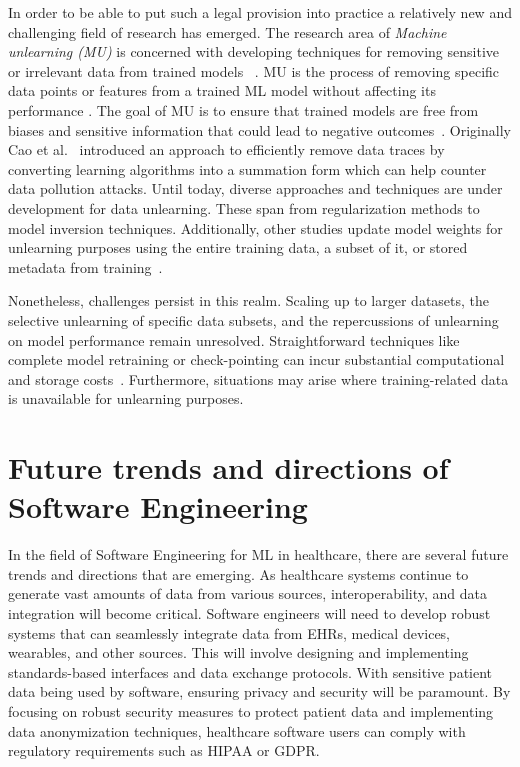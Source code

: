 \documentclass[11pt,runningheads]{article}
\begin{document}
In order to be able to put such a legal provision into practice a relatively new and challenging field of research has emerged. The research area of \textit{Machine unlearning (MU)} is concerned with developing techniques for removing sensitive or irrelevant data from trained models ~\cite{kurmanji2023towards}. MU is the process of removing specific data points or features from a trained ML model without affecting its performance \cite{shaik2023exploring, izzo2021approximate}. The goal of MU is to ensure that trained models are free from biases and sensitive information that could lead to negative outcomes~\cite{zhang2023review}. Originally Cao et al.~\cite{7163042} introduced an approach to efficiently remove data traces by converting learning algorithms into a summation form which can help counter data pollution attacks. Until today, diverse approaches and techniques are under development for data unlearning. These span from regularization methods to model inversion techniques. Additionally, other studies update model weights for unlearning purposes using the entire training data, a subset of it, or stored metadata from training~\cite{nguyen2022survey}.

Nonetheless, challenges persist in this realm. Scaling up to larger datasets, the selective unlearning of specific data subsets, and the repercussions of unlearning on model performance remain unresolved. Straightforward techniques like complete model retraining or check-pointing can incur substantial computational and storage costs~\cite{penteado2022regulation}. Furthermore, situations may arise where training-related data is unavailable for unlearning purposes.

\section{Future trends and directions of Software Engineering} 
In the field of Software Engineering for ML in healthcare, there are several future trends and directions that are emerging. 
As healthcare systems continue to generate vast amounts of data from various sources, interoperability, and data integration will become critical. Software engineers will need to develop robust systems that can seamlessly integrate data from  EHRs, medical devices, wearables, and other sources. This will involve designing and implementing standards-based interfaces and data exchange protocols. With sensitive patient data being used by software, ensuring privacy and security will be paramount. By focusing on robust security measures to protect patient data and implementing data anonymization techniques, healthcare software users can comply with regulatory requirements such as HIPAA or GDPR. 
\end{document}

